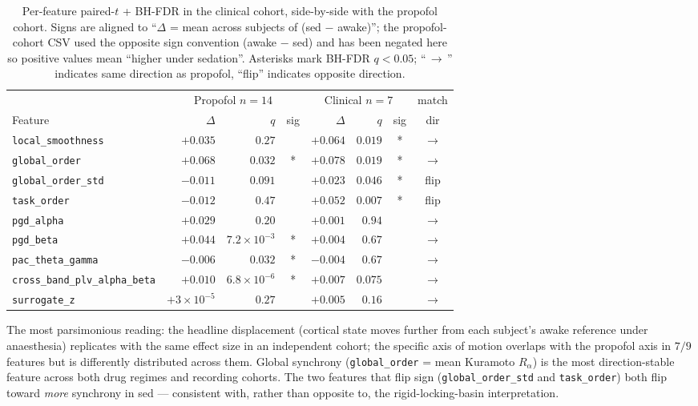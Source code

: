\documentclass[11pt,a4paper]{article}
\begin{document}
\begin{table}[h]
\centering\footnotesize
\caption{Per-feature paired-$t$ + BH-FDR in the clinical cohort, side-by-side with the propofol cohort. Signs are aligned to ``$\Delta$ = mean across subjects of (sed $-$ awake)''; the propofol-cohort CSV used the opposite sign convention (awake $-$ sed) and has been negated here so positive values mean ``higher under sedation''. Asterisks mark BH-FDR $q<0.05$; ``\,$\to$\,'' indicates same direction as propofol, ``flip'' indicates opposite direction.}\label{tab:clinical-features}
\begin{tabular}{lrrcrrcc}\toprule
& \multicolumn{3}{c}{Propofol $n=14$} & \multicolumn{3}{c}{Clinical $n=7$} & match \\
\cmidrule(lr){2-4}\cmidrule(lr){5-7}
Feature & $\Delta$ & $q$ & sig & $\Delta$ & $q$ & sig & dir \\
\midrule
\texttt{local\_smoothness}             & $+0.035$ & $0.27$            &        & $+0.064$ & $0.019$           & * & $\to$ \\
\texttt{global\_order}                 & $+0.068$ & $0.032$           & *      & $+0.078$ & $0.019$           & * & $\to$ \\
\texttt{global\_order\_std}            & $-0.011$ & $0.091$           &        & $+0.023$ & $0.046$           & * & flip \\
\texttt{task\_order}                   & $-0.012$ & $0.47$            &        & $+0.052$ & $0.007$           & * & flip \\
\texttt{pgd\_alpha}                    & $+0.029$ & $0.20$            &        & $+0.001$ & $0.94$            &        & $\to$ \\
\texttt{pgd\_beta}                     & $+0.044$ & $7.2\!\times\!10^{-3}$ & * & $+0.004$ & $0.67$            &        & $\to$ \\
\texttt{pac\_theta\_gamma}             & $-0.006$ & $0.032$           & *      & $-0.004$ & $0.67$            &        & $\to$ \\
\texttt{cross\_band\_plv\_alpha\_beta} & $+0.010$ & $6.8\!\times\!10^{-6}$ & * & $+0.007$ & $0.075$           &        & $\to$ \\
\texttt{surrogate\_z}                  & $+3\!\times\!10^{-5}$ & $0.27$ &       & $+0.005$ & $0.16$            &        & $\to$ \\
\bottomrule\end{tabular}
\end{table}

The most parsimonious reading: the headline displacement (cortical state moves further from each subject's awake reference under anaesthesia) replicates with the same effect size in an independent cohort; the specific axis of motion overlaps with the propofol axis in $7/9$ features but is differently distributed across them. Global synchrony (\texttt{global\_order} = mean Kuramoto $R_\alpha$) is the most direction-stable feature across both drug regimes and recording cohorts. The two features that flip sign (\texttt{global\_order\_std} and \texttt{task\_order}) both flip toward \emph{more} synchrony in sed --- consistent with, rather than opposite to, the rigid-locking-basin interpretation.
\end{document}

